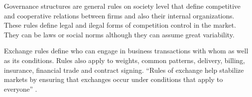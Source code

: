 \documentclass[a4paper, 12pt, openright, oneside, german, french, brazil, english]{abntex2}
\begin{document}
	
	Governance structures are general rules on society level that define competitive and cooperative relations between firms and also their internal organizations. These rules define legal and ilegal forms of competition control in the market. They can be laws or social norms although they can assume great variability.
	
	
	
	Exchange rules define who can engage in business transactions with whom as well as its conditions. Rules also apply to weights, common patterns, delivery, billing, insurance, financial trade and contract signing. ``Rules of exchange help stabilize markets by ensuring that exchanges occur under conditions that apply to everyone'' \cite[p. 35]{fligstein2002architecture}.
	
\end{document}
